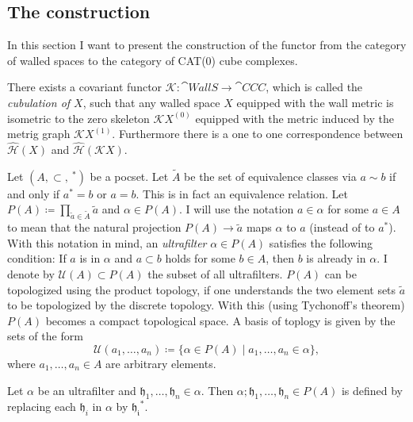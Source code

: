 \subsection{The construction}
\label{sec:construction}

In this section I want to present the construction of the functor from the category of walled spaces to the category of CAT(0) cube complexes.

\begin{thm}
  \label{thn:construction}
  There exists a covariant functor \(\mathcal{K} \colon \cat{WallS} \to \cat{CCC}\), which is called the \emph{cubulation of \(X\)}, such that any walled space \(X\) equipped with the wall metric is isometric to the zero skeleton \(\mathcal{K}X^{(0)}\) equipped with the metric induced by the metrig graph \(\mathcal{K}X^{(1)}\). Furthermore there is a one to one correspondence between \(\mathcal{\hat H}(X)\) and \(\mathcal{\hat H}(\mathcal{K}X)\).
\end{thm}

\begin{defin}[Ultrafilter]
  Let \((A, \subset, \ ^\ast)\) be a pocset. Let \(\tilde A\) be the set of equivalence classes via \(a \sim b\) if and only if \(a^\ast = b\) or \(a = b\). This is in fact an equivalence relation. Let \(P(A) \coloneqq \prod_{\tilde a \in \tilde A} \tilde a\) and \(\alpha \in P(A)\). I will use the notation \(a \in \alpha\) for some \(a \in A\) to mean that the natural projection \(P(A) \to \tilde a\) maps \(\alpha\) to \(a\) (instead of to \(a^\ast\)). With this notation in mind, an \emph{ultrafilter} \(\alpha \in P(A)\) satisfies the following condition: If \(a\) is in \(\alpha\) and \(a \subset b\) holds for some \(b \in A\), then \(b\) is already in \(\alpha\). I denote by \(\mathcal{U}(A) \subset P(A)\) the subset of all ultrafilters. \(P(A)\) can be topologized using the product topology, if one understands the two element sets \(\tilde a\) to be topologized by the discrete topology. With this (using Tychonoff's theorem) \(P(A)\) becomes a compact topological space. A basis of toplogy is given by the sets of the form
\[
  \mathcal{U}(a_1,\dots, a_n) \coloneqq \{\alpha \in P(A) \mid a_1, \dots, a_n \in \alpha\},
\]
where \(a_1,\dots, a_n \in A\) are arbitrary elements.
\end{defin}

\begin{defin}
  Let \(\alpha\) be an ultrafilter and \(\mathfrak{h}_1, \dots, \mathfrak{h}_n \in \alpha\). Then \(\alpha; \mathfrak{h}_1, \dots, \mathfrak{h}_n \in P(A)\) is defined by replacing each \(\mathfrak{h}_i\) in \(\alpha\) by \(\mathfrak{h_i}^\ast\).
\end{defin}

